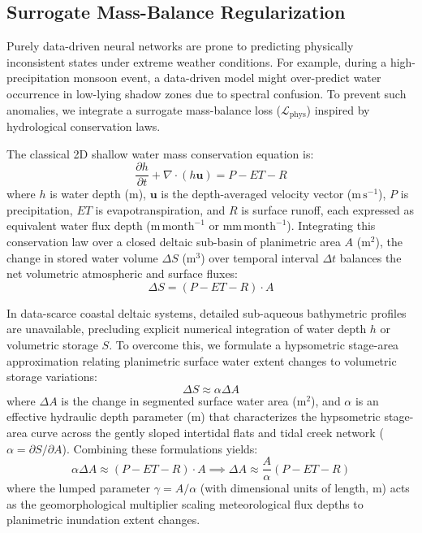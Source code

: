 \documentclass[journal]{IEEEtran}
\begin{document}
\subsection{Surrogate Mass-Balance Regularization}
Purely data-driven neural networks are prone to predicting physically inconsistent states under extreme weather conditions. For example, during a high-precipitation monsoon event, a data-driven model might over-predict water occurrence in low-lying shadow zones due to spectral confusion. To prevent such anomalies, we integrate a surrogate mass-balance loss ($\mathcal{L}_{\text{phys}}$) inspired by hydrological conservation laws.

The classical 2D shallow water mass conservation equation is:
\begin{equation}
\frac{\partial h}{\partial t} + \nabla \cdot (h \mathbf{u}) = P - ET - R
\end{equation}
where $h$ is water depth ($\mathrm{m}$), $\mathbf{u}$ is the depth-averaged velocity vector ($\mathrm{m\,s^{-1}}$), $P$ is precipitation, $ET$ is evapotranspiration, and $R$ is surface runoff, each expressed as equivalent water flux depth ($\mathrm{m\,month^{-1}}$ or $\mathrm{mm\,month^{-1}}$). Integrating this conservation law over a closed deltaic sub-basin of planimetric area $A$ ($\mathrm{m}^2$), the change in stored water volume $\Delta S$ ($\mathrm{m}^3$) over temporal interval $\Delta t$ balances the net volumetric atmospheric and surface fluxes:
\begin{equation}
\Delta S = (P - ET - R) \cdot A
\end{equation}

In data-scarce coastal deltaic systems, detailed sub-aqueous bathymetric profiles are unavailable, precluding explicit numerical integration of water depth $h$ or volumetric storage $S$. To overcome this, we formulate a hypsometric stage-area approximation relating planimetric surface water extent changes to volumetric storage variations:
\begin{equation}
\Delta S \approx \alpha \Delta A
\end{equation}
where $\Delta A$ is the change in segmented surface water area ($\mathrm{m}^2$), and $\alpha$ is an effective hydraulic depth parameter ($\mathrm{m}$) that characterizes the hypsometric stage-area curve across the gently sloped intertidal flats and tidal creek network ($\alpha = \partial S / \partial A$). Combining these formulations yields:
\begin{equation}
\alpha \Delta A \approx (P - ET - R) \cdot A \implies \Delta A \approx \frac{A}{\alpha} (P - ET - R)
\end{equation}
where the lumped parameter $\gamma = A / \alpha$ (with dimensional units of length, $\mathrm{m}$) acts as the geomorphological multiplier scaling meteorological flux depths to planimetric inundation extent changes.
\end{document}
